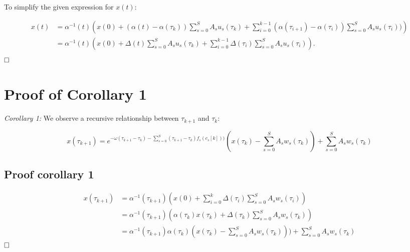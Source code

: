 \documentclass{article}
\begin{document}
To simplify the given expression for \( x(t) \):

\begin{align*}
 x(t) &= \alpha^{-1}(t) \left( x(0) + \left(\alpha(t) - \alpha(\tau_{k})\right) \sum_{s=0}^{S} A_s u_s(\tau_k)  + \sum_{i=0}^{k-1} \left(\alpha(\tau_{i+1}) - \alpha(\tau_{i})\right) \sum_{s=0}^{S} A_s u_s(\tau_i) )\right) \\
  &= \alpha^{-1}(t) \left( x(0) + \Delta(t)\sum_{s=0}^{S} A_s u_s(\tau_k) +\sum_{i=0}^{k-1} \Delta(\tau_i)\sum_{s=0}^{S} A_s u_s(\tau_i) \right). \\
\end{align*}
$\hfill \square$

\section{Proof of Corollary 1}

\textit{Corollary 1:} We observe a recursive relationship between $\tau_{k+1}$ and $\tau_{k}$:

\[ x(\tau_{k+1})
 = e^{-\omega(\tau_{k+1}-\tau_k) - \sum_{s=0}^{S}(\tau_{k+1}-\tau_{k})f_s(c_s[k]))} \left(x(\tau_{k}) -\sum_{s=0}^{S} A_s w_s(\tau_{k})\right) + \sum_{s=0}^{S} A_s w_s(\tau_{k})
\]

\subsection{Proof corollary 1 }

\begin{align*}
 x(\tau_{k+1})&= 
 \alpha^{-1}(\tau_{k+1}) \left( x(0) + \sum_{i=0}^{k} \Delta(\tau_i)  \sum_{s=0}^{S} A_s w_s(\tau_i) \right) \\   
  &= \alpha^{-1}(\tau_{k+1})\left(\alpha(\tau_{k}) x(\tau_{k}) + \Delta(\tau_{k})  \sum_{s=0}^{S} A_s w_s(\tau_{k})\right) \\
   &= \alpha^{-1}(\tau_{k+1})\alpha(\tau_{k}) \left(x(\tau_{k}) -\sum_{s=0}^{S} A_s w_s(\tau_{k})\right)) + \sum_{s=0}^{S} A_s w_s(\tau_{k})
\end{align*}
$\hfill \square$


\end{document}

